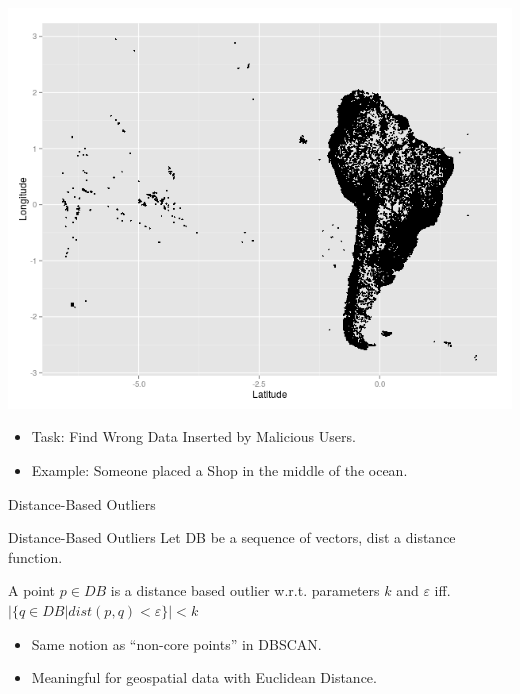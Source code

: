 \documentclass{beamer}
\begin{document}
\begin{frame}
    \begin{center}
    \includegraphics[width=.7\textwidth]{images/south_america.png} 
    \end{center}
    \begin{itemize}
        \item Task: Find Wrong Data Inserted by Malicious Users.

        \item Example: Someone placed a Shop in the middle of the ocean.

    \end{itemize}
\end{frame}

\begin{frame}{Distance-Based Outliers}
    \begin{block}{Distance-Based Outliers}
        Let DB be a sequence of vectors, dist a distance function.

        A point $p\in DB$ is a distance based outlier w.r.t. parameters $k$ and $\varepsilon$
        iff. $|\{q\in DB | dist(p,q) < \varepsilon\}| < k$
    \end{block}

    \begin{itemize}
        \item Same notion as ``non-core points'' in DBSCAN.
        \item Meaningful for geospatial data with Euclidean Distance.
    \end{itemize}
\end{frame}
\end{document}
